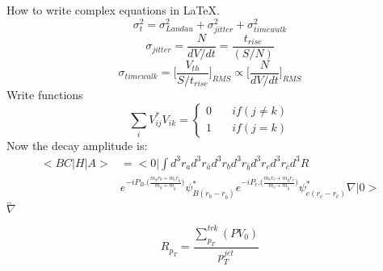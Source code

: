 \documentclass[a4paper,12pt]{book}
\begin{document}
How to write complex equations in LaTeX.
\begin{equation}
	\sigma_{t}^{2}=\sigma_{Landau}^{2}+\sigma_{jitter}^{2}+\sigma_{timewalk}^{2}
\end{equation}
\begin{equation}
\sigma_{jitter}=\frac{N}{dV/dt}=\frac{t_{rise}}{(S/N)}
\end{equation}
\begin{equation}
\sigma_{timewalk}=\Big[\frac{V_{th}}{S/t_{rise}}\Big]_{RMS}\propto\Big[\frac{N}{dV/dt}\Big]_{RMS}
\end{equation}
Write functions
\begin{equation}
\sum_{i}^{} V_{ij}^{*}V_{ik}= \left\{
\begin{array}{ll}
0 & \quad if (j\neq k) \\
1 & \quad if (j = k)
\end{array}
\right.
\end{equation}
Now the decay amplitude is:
\begin{equation}
\begin{split}
< BC|H|A> & =<0|\int d^{3}r_{a}d^{3}r_{\bar{a}}d^{3}r_{b}d^{3}r_{\bar{b}}d^{3}r_{c}d^{3}r_{\bar{c}}d^{3}R\\
& e^{-iP_{B}.\Big(\frac{m_{q}r_{b}+m_{\bar{c}}r_{\bar{b}}}{m_{q}+m_{\bar{b}}}\Big)}\psi^{*}_{B(r_{b}-r_{\bar{b}})}e^{-iP_{c}.\Big(\frac{m_{c}r_{c}+m_{\bar{q}}r_{\bar{c}}}{m_{c}+m_{\bar{q}}}\Big)}\psi^{*}_{c(r_{c}-r_{\bar{c}})}\nabla|0> 
\end{split}
\end{equation}
$\overleftrightarrow{\nabla}$

\date{\today}
\begin{equation}
R_{p_{T}}=\frac{\sum_{p_{T}}^{trk}(PV_{0})}{p_{T}^{jet}}
\end{equation}
\end{document}
